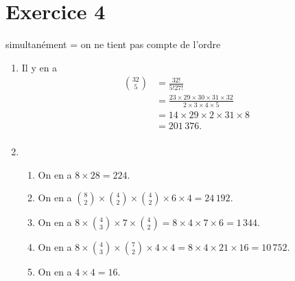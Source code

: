 \part{Exercice 4}

{\small simultanément = on ne tient pas compte de l'ordre}

\begin{enumerate}
	\item Il y en a
		\begin{align*}
			{32\choose5} &= \frac{32!}{5!27!}\\
			&= \frac{23\times 29\times 30 \times 31\times 32}{2\times 3\times 4\times 5}\\
			&= 14\times 29\times 2\times 31\times 8\\
			&= 201\,376. \\
		\end{align*}
	\item 
		\begin{enumerate}
			\item On en a $8\times 28 = 224$.
			\item On en a ${8\choose 2}\times {4\choose 2}\times {4\choose 2}\times 6\times 4 = 24\,192$.
			\item On en a $8 \times {4\choose 3} \times 7 \times {4\choose 2} = 8 \times 4 \times 7 \times 6 =1\,344$.
			\item On en a $8 \times {4\choose 3} \times {7 \choose 2} \times 4 \times 4 = 8 \times 4 \times 21 \times 16 = 10\,752$.
			\item On en a $4\times 4 = 16$.
		\end{enumerate}
\end{enumerate}
